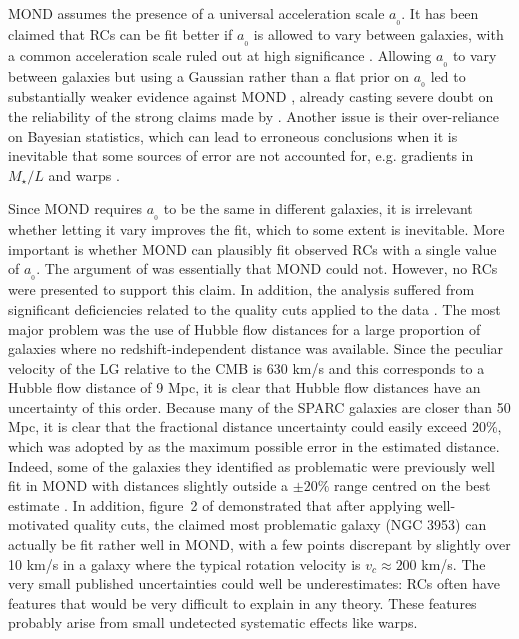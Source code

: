 \documentclass[fleqn,usenatbib,useAMS,onecolumn]{mnras} %
\begin{document}
MOND assumes the presence of a universal acceleration scale $a_{_0}$. It has been claimed that RCs can be fit better if $a_{_0}$ is allowed to vary between galaxies, with a common acceleration scale ruled out at high significance \citep{Rodrigues_2018}. Allowing $a_{_0}$ to vary between galaxies but using a Gaussian rather than a flat prior on $a_{_0}$ led to substantially weaker evidence against MOND \citep{Chang_2019}, already casting severe doubt on the reliability of the strong claims made by \citet{Rodrigues_2018}. Another issue is their over-reliance on Bayesian statistics, which can lead to erroneous conclusions when it is inevitable that some sources of error are not accounted for, e.g. gradients in $M_{\star}/L$ and warps \citep{Cameron_2020}.

Since MOND requires $a_{_0}$ to be the same in different galaxies, it is irrelevant whether letting it vary improves the fit, which to some extent is inevitable. More important is whether MOND can plausibly fit observed RCs with a single value of $a_{_0}$. The argument of \citet{Rodrigues_2018} was essentially that MOND could not. However, no RCs were presented to support this claim. In addition, the analysis suffered from significant deficiencies related to the quality cuts applied to the data \citep{Kroupa_2018}. The most major problem was the use of Hubble flow distances for a large proportion of galaxies where no redshift-independent distance was available. Since the peculiar velocity of the LG relative to the CMB is 630 km/s \citep{Kogut_1993} and this corresponds to a Hubble flow distance of 9 Mpc, it is clear that Hubble flow distances have an uncertainty of this order. Because many of the SPARC galaxies are closer than 50 Mpc, it is clear that the fractional distance uncertainty could easily exceed 20\%, which was adopted by \citet{Rodrigues_2018} as the maximum possible error in the estimated distance. Indeed, some of the galaxies they identified as problematic were previously well fit in MOND with distances slightly outside a $\pm20\%$ range centred on the best estimate \citep{Li_2018}. In addition, figure~2 of \citet{Kroupa_2018} demonstrated that after applying well-motivated quality cuts, the claimed most problematic galaxy (NGC 3953) can actually be fit rather well in MOND, with a few points discrepant by slightly over 10 km/s in a galaxy where the typical rotation velocity is $v_c \approx 200$ km/s. The very small published uncertainties could well be underestimates: RCs often have features that would be very difficult to explain in any theory. These features probably arise from small undetected systematic effects like warps.
\end{document}
